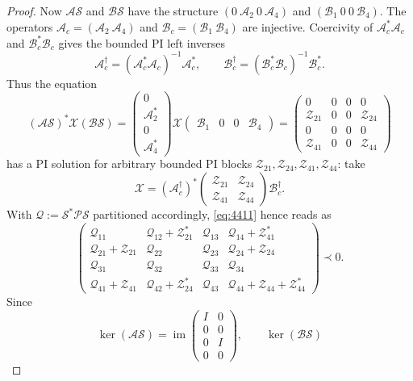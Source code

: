 \documentclass[10pt,a4paper]{article}
\newcommand{\extra}[1]{\textcolor{assumption}{#1}}
\newcommand{\op}[1]{\mathcal{#1}}
\begin{document}
\begin{proof}
Now $\op A\op S$ and $\op B\op S$ have the structure
$(0\ \op A_2\ 0\ \op A_4)$ and
$(\op B_1\ 0\ 0\ \op B_4)$.
The operators $\op A_c=(\op A_2\ \op A_4)$ and
$\op B_c=(\op B_1\ \op B_4)$ are injective.
\extra{Coercivity of $\op A_c^*\op A_c$ and $\op B_c^*\op B_c$}
gives the bounded PI left inverses
\[
 \op A_c^\dagger=(\op A_c^*\op A_c)^{-1}\op A_c^*,\qquad
 \op B_c^\dagger=(\op B_c^*\op B_c)^{-1}\op B_c^*.
\]
Thus the equation
\[
 (\op A\op S)^*\op X(\op B\op S)
 =
 \begin{pmatrix}0\\\op A_2^*\\0\\\op A_4^*\end{pmatrix}
 \op X\begin{pmatrix}\op B_1&0&0&\op B_4\end{pmatrix}
 =
 \begin{pmatrix}
 0&0&0&0\\
 \op Z_{21}&0&0&\op Z_{24}\\
 0&0&0&0\\
 \op Z_{41}&0&0&\op Z_{44}
 \end{pmatrix}
\]
has a PI solution for arbitrary bounded PI blocks
$\op Z_{21},\op Z_{24},\op Z_{41},\op Z_{44}$: take
\[
 \op X=(\op A_c^\dagger)^*
 \begin{pmatrix}\op Z_{21}&\op Z_{24}\\
                 \op Z_{41}&\op Z_{44}\end{pmatrix}
 \op B_c^\dagger.
\]
With $\op Q:=\op S^*\op P\op S$ partitioned accordingly,
\eqref{eq:4411} hence reads as
\begin{equation}\tag{4.4.12}\label{eq:4412}
\begin{pmatrix}
 \op Q_{11}&\op Q_{12}+\op Z_{21}^*&\op Q_{13}&\op Q_{14}+\op Z_{41}^*\\
 \op Q_{21}+\op Z_{21}&\op Q_{22}&\op Q_{23}&\op Q_{24}+\op Z_{24}\\
 \op Q_{31}&\op Q_{32}&\op Q_{33}&\op Q_{34}\\
 \op Q_{41}+\op Z_{41}&\op Q_{42}+\op Z_{24}^*&\op Q_{43}
   &\op Q_{44}+\op Z_{44}+\op Z_{44}^*
\end{pmatrix}\prec0.
\end{equation}
Since
\[
 \ker(\op A\op S)
 =\operatorname{im}\begin{pmatrix}I&0\\0&0\\0&I\\0&0\end{pmatrix},
 \qquad
 \ker(\op B\op S)
\]
\end{proof}
\end{document}
